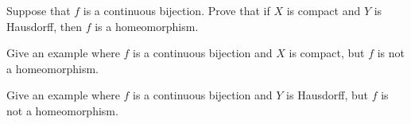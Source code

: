 \item Suppose that $f$ is a continuous bijection. Prove that if $X$ is compact and $Y$ is Hausdorff, then $f$ is a homeomorphism.

\item Give an example where $f$ is a continuous bijection and $X$ is compact, but $f$ is not a homeomorphism.

\item Give an example where $f$ is a continuous bijection and $Y$ is Hausdorff, but $f$ is not a homeomorphism.

\ea

\begin{comment}

\ExerciseSolution

\ba

\item Let $C$ be a closed subset of $X$. Activity 17.4 shows that closed subsets of a compact space are compact, so we know that $C$ is compact. Activity 17.2 shows that $f(C)$ is compact. Since $Y$ is Hausdorff, Theorem 17.6 allows us to conclude that that $f(C)$ is closed. So $f$ sends closed sets to closed sets. 

\item To show that $f^{-1}$ is continuous, we use the result of Exercise \ref{ex:continuity_closed_topology} on page \pageref{ex:continuity_closed_topology} and show that $(f^{-1})^{-1}(C)$ is closed in $Y$ whenever $C$ is closed in $X$. Let $C$ be a closed set in $X$. Part (a) shows that $f(C)$ is also closed. But $f$ is a bijection, so $C = (f^{-1})^{-1}(C)$. 

\item Let $X = \{a,b,c,d\} = Y$, let $\tau_X$ be the discrete topology on $X$ and $\tau_Y = \{\emptyset, \{a\}, \{b,c\}, \{a,b,c\}, Y\}$ the topology on $Y$. As a finite space, we know that $X$ is compact. Since $\{b\}$ is not a closed set, we know that $Y$ is not a Hausdorff space. Define $f: X \to Y$ by $f(x) = x$ for all $x \in X$. Then $f$ is the identity function, so is a bijection. The fact that every subset of $X$ is open means that $f$ is continuous. But $\{b\}$ is an open set in $X$ while $f(\{b\} = \{b\}$ is not an open set in $Y$. Thus, $f$ is not an open function and not a homeomorphism.

\item Let $X = \R = Y$, let $\tau_X$ be the discrete topology on $X$ and $\tau_Y$ the Euclidean topology on $Y$. As an infinite space with the discrete metric, we know that $X$ is not compact. Since $Y$ is a metric space we know that $Y$ is Hausdorff. Define $f: X \to Y$ by $f(x) = x$ for all $x \in X$. Then $f$ is the identity function, so is a bijection. The fact that every subset of $X$ is open means that $f$ is continuous. But the set $\{0\}$ is an open set in $X$ while $f(\{0\} = \{0\}$ is not an open set in $Y$. Thus, $f$ is not an open function and not a homeomorphism.

\ea

\end{comment}


